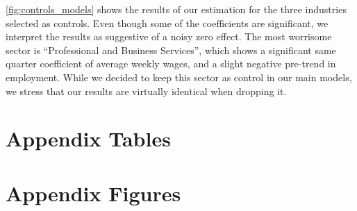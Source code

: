 \autoref{fig:controls_models} shows the results of our estimation for the three industries 
selected as controls. Even though some of the coefficients are significant, we interpret the 
results as suggestive of a noisy zero effect. The most worrisome sector is ``Professional 
and Business Services'', which shows a significant same quarter coefficient of average weekly
wages, and a slight negative pre-trend in employment. While we decided to keep this sector as
control in our main models, we stress that our results are virtually identical when dropping it.

\clearpage
\section{Appendix Tables}



\clearpage
\section{Appendix Figures}



